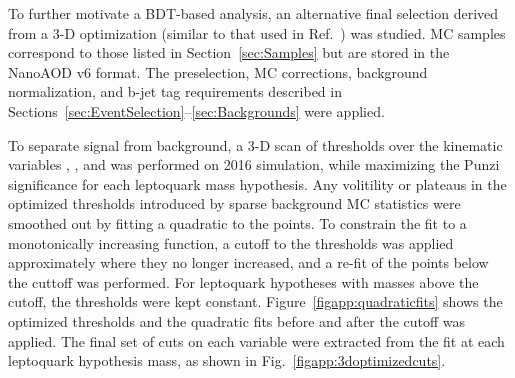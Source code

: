 To further motivate a BDT-based analysis, an alternative final selection derived from a 3-D optimization (similar to that used in Ref.~\cite{CMSLQ2_2016}) was studied. MC samples correspond to those listed in Section~\ref{sec:Samples} but are stored in the NanoAOD v6 format. The preselection, MC corrections, background normalization, and b-jet tag requirements described in Sections~\ref{sec:EventSelection}--\ref{sec:Backgrounds} were applied. 

To separate signal from background, a 3-D scan of thresholds over the kinematic variables \ST, \Muu, and \MujTwo was performed on 2016 simulation, while maximizing the Punzi significance for each leptoquark mass hypothesis. Any volitility or plateaus in the optimized thresholds introduced by sparse background MC statistics were smoothed out by fitting a quadratic to the points. To constrain the fit to a monotonically increasing function, a cutoff to the thresholds was applied approximately where they no longer increased, and a re-fit of the points below the cuttoff was performed. For leptoquark hypotheses with masses above the cutoff, the thresholds were kept constant. Figure~\ref{figapp:quadraticfits} shows the optimized thresholds and the quadratic fits before and after the cutoff was applied. The final set of cuts on each variable were extracted from the fit at each leptoquark hypothesis mass, as shown in Fig.~\ref{figapp:3doptimizedcuts}.

